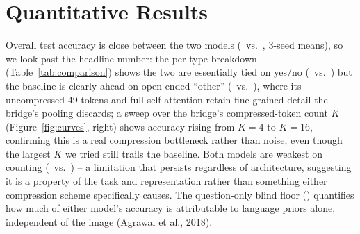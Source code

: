 \documentclass[final]{article}
\begin{document}
\begin{table}[!htbp]
\centering
\footnotesize
{}
\caption{Baseline vs.\ primary, full-scale test set (\testSetSize\ questions: \testSetYN\
yes/no, \testSetOther\ other, \testSetNum\ number), each tuned via a 6-configuration
validation-loss-selected search, 3-seed mean test accuracy, plus the newly collected photo
evaluation (see Evaluate on New Data).}
\label{tab:comparison}
\end{table}

\section*{Quantitative Results}

Overall test accuracy is close between the two models (\baselineTestAcc\ vs.\ \primaryTestAcc, 3-seed
means), so we look past the headline number: the per-type breakdown (Table~\ref{tab:comparison})
shows the two are essentially tied on yes/no (\baselineAccYN\ vs.\ \primaryAccYN) but the baseline
is clearly ahead on open-ended ``other'' (\baselineAccOther\ vs.\ \primaryAccOther), where its
uncompressed 49 tokens and full self-attention retain fine-grained detail the bridge's pooling
discards; a sweep over the bridge's compressed-token count $K$ (Figure~\ref{fig:curves}, right)
shows accuracy rising from $K{=}4$ to $K{=}16$, confirming this is a real compression bottleneck
rather than noise, even though the largest $K$ we tried still trails the baseline. Both models are
weakest on counting (\baselineAccNum\ vs.\ \primaryAccNum) -- a limitation that persists regardless
of architecture, suggesting it is a property of the task and representation rather than something
either compression scheme specifically causes. The question-only blind floor (\blindFloor)
quantifies how much of either model's accuracy is attributable to language priors alone,
independent of the image (Agrawal et al., 2018).
\end{document}
